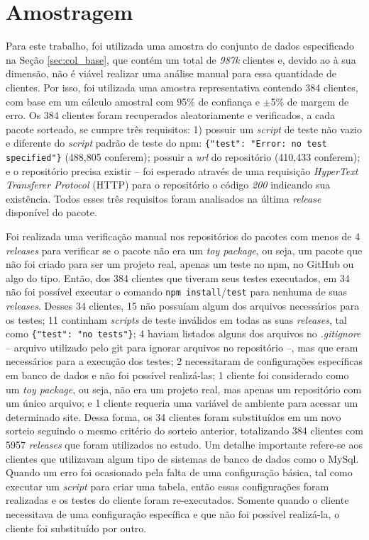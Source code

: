 \section{Amostragem}
\label{sec:col_amostra}
Para este trabalho, foi utilizada uma amostra do conjunto de dados especificado na Seção \ref{sec:col_base}, que contém um total de \textit{987k} clientes e, devido ao à sua dimensão, não é viável realizar uma análise manual para essa quantidade de clientes. Por isso, foi utilizada uma amostra representativa contendo 384 clientes, com base em um cálculo amostral com 95\% de confiança e $\pm$5\% de margem de erro. Os 384 clientes foram recuperados aleatoriamente e verificados, a cada pacote sorteado, se cumpre três requisitos: 1) possuir um \textit{script} de teste não vazio e diferente do \textit{script} padrão de teste do \textsf{npm}: \texttt{\{"test": "Error: no test specified"\}} (488,805 conferem); possuir a \textit{url} do repositório (410,433 conferem); e o repositório precisa existir -- foi esperado através de uma requisição \textit{HyperText Transferer Protocol} (HTTP) para o repositório o código \textit{200} indicando sua existência. Todos esses três requisitos foram analisados na última \textit{release} disponível do pacote.

Foi realizada uma verificação manual nos repositórios do pacotes com menos de 4 \textit{releases} para verificar se o pacote não era um \textit{toy package}, ou seja, um pacote que não foi criado para ser um projeto real, apenas um teste no \textsf{npm}, no \textsf{GitHub} ou algo do tipo. Então, dos 384 clientes que tiveram seus testes executados, em 34 não foi possível executar o comando \texttt{npm install}/\texttt{test} para nenhuma de suas \textit{releases}. Desses 34 clientes, 15 não possuíam algum dos arquivos necessários para os testes; 11 continham \textit{scripts} de teste inválidos em todas as suas \textit{releases}, tal como \texttt{\{"test": "no tests"\}}; 4 haviam listados alguns dos arquivos no \textit{.gitignore} -- arquivo utilizado pelo \textsf{git} para ignorar arquivos no repositório --, mas que eram necessários para a execução dos testes; 2 necessitaram de configurações específicas em banco de dados e não foi possível realizá-las; 1 cliente foi considerado como um \textit{toy package}, ou seja, não era um projeto real, mas apenas um repositório com um único arquivo; e 1 cliente requeria uma variável de ambiente para acessar um determinado site. Dessa forma, os 34 clientes foram substituídos em um novo sorteio seguindo o mesmo critério do sorteio anterior, totalizando 384 clientes com 5957 \textit{releases} que foram utilizados no estudo. Um detalhe importante refere-se aos clientes que utilizavam algum tipo de sistemas de banco de dados como o \textsf{MySql}. Quando um erro foi ocasionado pela falta de uma configuração básica, tal como executar um \textit{script} para criar uma tabela, então essas configurações foram realizadas e os testes do cliente foram re-executados. Somente quando o cliente necessitava de uma configuração específica e que não foi possível realizá-la, o cliente foi substituído por outro.

